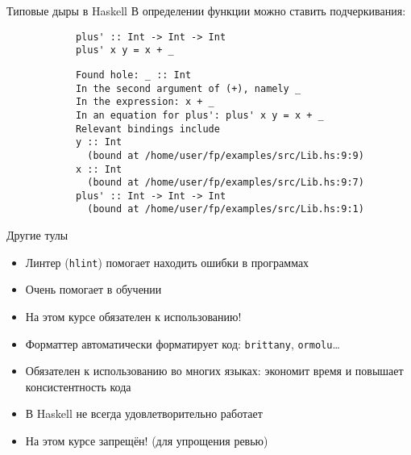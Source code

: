     \begin{frame}[fragile]{Типовые дыры в Haskell}
        В определении функции можно ставить подчеркивания:
        \begin{verbatim}
            plus' :: Int -> Int -> Int
            plus' x y = x + _
        \end{verbatim}
        \vspace{1em}
        \begin{verbatim}
            Found hole: _ :: Int
            In the second argument of (+), namely _
            In the expression: x + _
            In an equation for plus': plus' x y = x + _
            Relevant bindings include
            y :: Int
              (bound at /home/user/fp/examples/src/Lib.hs:9:9)
            x :: Int
              (bound at /home/user/fp/examples/src/Lib.hs:9:7)
            plus' :: Int -> Int -> Int
              (bound at /home/user/fp/examples/src/Lib.hs:9:1)
        \end{verbatim}
    \end{frame}

    \begin{frame}[fragile]{Другие тулы}
        \begin{itemize}
            \item Линтер (\texttt{hlint}) помогает находить ошибки в программах
            \item Очень помогает в обучении
            \item[\NB] На этом курсе обязателен к использованию!
            \item Форматтер автоматически форматирует код: \texttt{brittany}, \texttt{ormolu}\ldots
            \item Обязателен к использованию во многих языках: экономит время и повышает консистентность кода
            \item В Haskell не всегда удовлетворительно работает
            \item[\NB] На этом курсе запрещён! (для упрощения ревью)
        \end{itemize}
    \end{frame}

